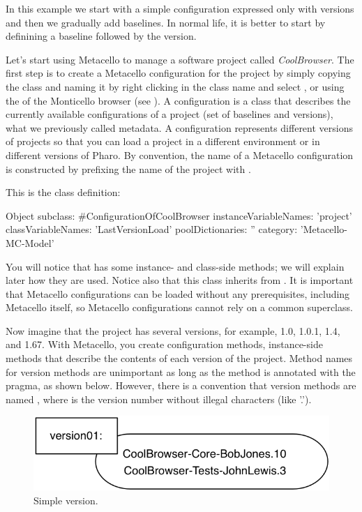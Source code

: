 \documentclass[a4paper,10pt,twoside]{book}
\begin{document}
In this example we start with a simple configuration expressed only with versions and then we gradually add baselines. In normal life, it is better to start by definining a baseline followed by the version.

Let's start using Metacello to manage a software project called \emph{CoolBrowser}. The first step is to create a Metacello configuration for the project by simply copying the class  and naming it  by right clicking in the class name and select , or using the  of the Monticello browser (see ). A configuration is a class that describes the currently available configurations of a project (set of baselines and versions), \ie what we previously called metadata. A configuration represents different versions of projects so that you can load a project in a different environment or in different versions of Pharo.
By convention, the name of a Metacello configuration is constructed by prefixing the name of the project with .

This is the class definition:
\begin{code}{}
Object subclass: #ConfigurationOfCoolBrowser
       instanceVariableNames: 'project'
       classVariableNames: 'LastVersionLoad'
       poolDictionaries: ''
       category: 'Metacello-MC-Model'
\end{code}

You will notice that  has some instance- and class-side methods; we will explain later how they are used. Notice also that this class inherits from .  It is important that Metacello configurations can be loaded without any prerequisites, including Metacello itself, so Metacello configurations cannot rely on a common superclass.

Now imagine that the project  has several versions, for example, 1.0, 1.0.1, 1.4, and 1.67.
With Metacello, you create configuration methods, instance-side methods that describe the contents of each version of the project. Method names for version methods are unimportant as long as the method is annotated with the  pragma, as shown below.  However, there is a  convention that  version methods are named , where  is the version number without illegal characters (like '.').


\begin{figure}
\begin{center}
\includegraphics[width=0.6\linewidth]{version01}
\caption{Simple version.\label{version01}}
\end{center}
\end{figure}
\end{document}
